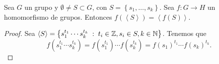\begin{prop}
	Sea $\displaystyle G $ un grupo y $\displaystyle \emptyset \neq S \subset G $, con $\displaystyle S = \left\{ s_{1}, \ldots, s_{k}\right\}  $. Sea $\displaystyle f : G \to H $ un homomorfismo de grupos. Entonces $\displaystyle f\left(\left\langle S \right\rangle \right) = \left\langle f\left(S\right) \right\rangle  $.
\end{prop}
\begin{proof}
	Sea $\displaystyle \left\langle S \right\rangle = \left\{ s_{1}^{t_{1}} \cdots s_{k}^{t_{k}} \; : \; t_{i} \in \mathbb{Z}, s_{i} \in S, k \in \mathbb{N}\right\}  $. Tenemos que
	\[f\left(s_{1}^{t_{1}} \cdots s_{k}^{t_{k}}\right) = f\left(s_{1}^{t_{1}}\right) \cdots f\left(s_{k}^{t_{k}}\right) = f\left(s_{1}\right)^{t_{1}} \cdots f\left(s_{k}\right)^{t_{k}} .\]
\end{proof}
